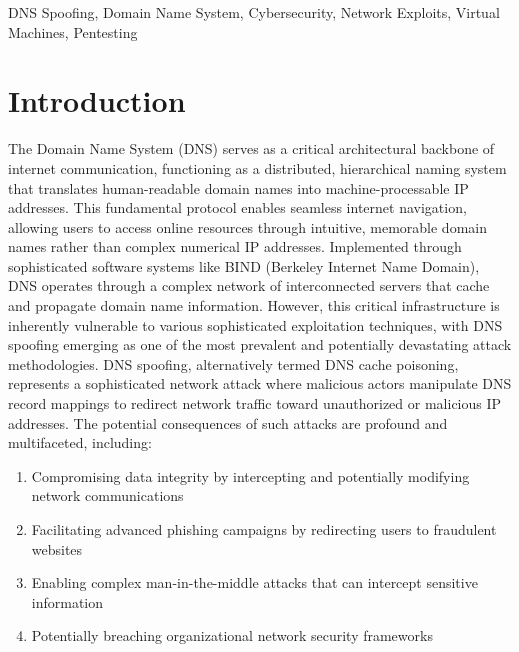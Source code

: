 \documentclass[conference,letterpaper]{IEEEtran}
\begin{document}
\begin{IEEEkeywords}
  DNS Spoofing, Domain Name System, Cybersecurity, Network Exploits, Virtual Machines, Pentesting
\end{IEEEkeywords}

\section{Introduction}

The Domain Name System (DNS) serves as a critical architectural backbone of internet communication, functioning as a distributed, hierarchical naming system that translates human-readable domain names into machine-processable IP addresses. This fundamental protocol enables seamless internet navigation, allowing users to access online resources through intuitive, memorable domain names rather than complex numerical IP addresses.
Implemented through sophisticated software systems like BIND (Berkeley Internet Name Domain)\cite{aliDNSUsingBIND2015}, DNS operates through a complex network of interconnected servers that cache and propagate domain name information. However, this critical infrastructure is inherently vulnerable to various sophisticated exploitation techniques, with DNS spoofing emerging as one of the most prevalent and potentially devastating attack methodologies.
DNS spoofing, alternatively termed DNS cache poisoning, represents a sophisticated network attack where malicious actors manipulate DNS record mappings to redirect network traffic toward unauthorized or malicious IP addresses. The potential consequences of such attacks are profound and multifaceted, including:

\begin{enumerate}
\item Compromising data integrity by intercepting and potentially modifying network communications
\item Facilitating advanced phishing campaigns by redirecting users to fraudulent websites
\item Enabling complex man-in-the-middle attacks that can intercept sensitive information
\item Potentially breaching organizational network security frameworks
\end{enumerate}
\end{document}
